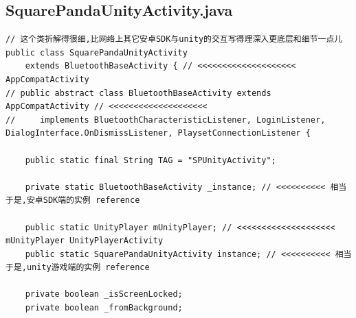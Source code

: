 \documentclass[9pt, b5paper]{article}
\begin{document}
\subsection{SquarePandaUnityActivity.java}
\label{sec-6-2}
\begin{verbatim}
// 这个类折解得很细,比网络上其它安卓SDK与unity的交互写得理深入更底层和细节一点儿
public class SquarePandaUnityActivity
    extends BluetoothBaseActivity { // <<<<<<<<<<<<<<<<<<<< AppCompatActivity
// public abstract class BluetoothBaseActivity extends AppCompatActivity // <<<<<<<<<<<<<<<<<<<< 
//     implements BluetoothCharacteristicListener, LoginListener, DialogInterface.OnDismissListener, PlaysetConnectionListener {
    
    public static final String TAG = "SPUnityActivity";

    private static BluetoothBaseActivity _instance; // <<<<<<<<<< 相当于是,安卓SDK端的实例 reference

    public static UnityPlayer mUnityPlayer; // <<<<<<<<<<<<<<<<<<<< mUnityPlayer UnityPlayerActivity
    public static SquarePandaUnityActivity instance; // <<<<<<<<<< 相当于是,unity游戏端的实例 reference

    private boolean _isScreenLocked;
    private boolean _fromBackground;


\end{verbatim}
\end{document}
